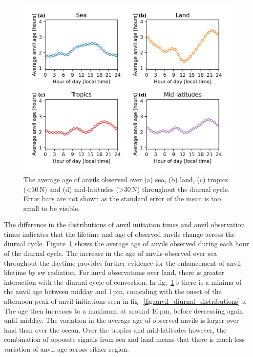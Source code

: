 \begin{figure}[tp]
    \centering
    \includegraphics[width=\textwidth]{figures/chapter2_27.png}
    \caption[
    The average age of anvils observed over sea, land, tropics and mid-latitudes throughout the diurnal cycle.
    ]{
    The average age of anvils observed over (a) sea, (b) land, (c) tropics (\textless 30\,\textdegree N) and (d) mid-latitudes (\textgreater 30\,\textdegree N) throughout the diurnal cycle. Error bars are not shown as the standard error of the mean is too small to be visible.
    }
    \label{fig:anvil_diurnal_age}
\end{figure}

The difference in the distributions of anvil initiation times and anvil observation times indicates that the lifetime and age of observed anvils change across the diurnal cycle.
Figure~\ref{fig:anvil_diurnal_age} shows the average age of anvils observed during each hour of the diurnal cycle.
The increase in the age of anvils observed over sea throughout the daytime provides further evidence for the enhancement of anvil lifetime by \acrshort{sw} radiation.
For anvil observations over land, there is greater interaction with the diurnal cycle of convection.
In fig.~\ref{fig:anvil_diurnal_age}\,b there is a minima of the anvil age between midday and 1\,pm, coinciding with the onset of the afternoon peak of anvil initiations seen in fig.~\ref{fig:anvil_diurnal_distributions}\,b.
The age then increases to a maximum at around 10\,pm, before decreasing again until midday.
The variation in the average age of observed anvils is larger over land than over the ocean.
Over the tropics and mid-latitudes however, the combination of opposite signals from sea and land means that there is much less variation of anvil age across either region.



